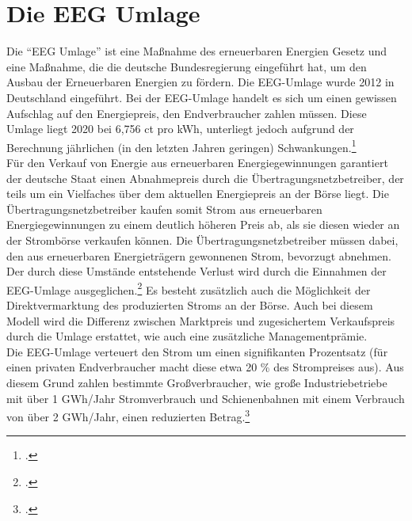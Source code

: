 \section{Die EEG Umlage}
Die \enquote{EEG Umlage} ist eine Maßnahme des erneuerbaren Energien Gesetz und eine Maßnahme, die die deutsche Bundesregierung eingeführt hat, um den Ausbau der Erneuerbaren Energien zu fördern.
Die EEG-Umlage wurde 2012 in Deutschland eingeführt. 
Bei der EEG-Umlage handelt es sich um einen gewissen Aufschlag auf den Energiepreis, den Endverbraucher zahlen müssen.
Diese Umlage liegt 2020 bei 6,756 ct pro kWh, unterliegt jedoch aufgrund der Berechnung jährlichen (in den letzten Jahren geringen) Schwankungen.\footcite[Vgl.][]{Netztransparenz2020}\\
Für den Verkauf von Energie aus erneuerbaren Energiegewinnungen garantiert der deutsche Staat einen Abnahmepreis durch die Übertragungsnetzbetreiber, der teils um ein Vielfaches über dem aktuellen Energiepreis an der Börse liegt.
Die Übertragungsnetzbetreiber kaufen somit Strom aus erneuerbaren Energiegewinnungen zu einem deutlich höheren Preis ab, als sie diesen wieder an der Strombörse verkaufen können. 
Die Übertragungsnetzbetreiber müssen dabei, den aus erneuerbaren Energieträgern gewonnenen Strom, bevorzugt abnehmen.
Der durch diese Umstände entstehende Verlust wird durch die Einnahmen der EEG-Umlage ausgeglichen.\footcite[Vgl. auch im Folgenden][]{Bundesnetzagentur2020}
Es besteht zusätzlich auch die Möglichkeit der Direktvermarktung des produzierten Stroms an der Börse. Auch bei diesem Modell wird die Differenz zwischen Marktpreis und zugesichertem Verkaufspreis durch die Umlage erstattet, wie auch eine zusätzliche Managementprämie.
\\
Die EEG-Umlage verteuert den Strom um einen signifikanten Prozentsatz (für einen privaten Endverbraucher macht diese etwa 20 \% des Strompreises aus). 
Aus diesem Grund zahlen bestimmte Großverbraucher, wie große Industriebetriebe mit über 1 GWh/Jahr Stromverbrauch und Schienenbahnen mit einem Verbrauch von über 2 GWh/Jahr, einen reduzierten Betrag.\footcite[Vgl.][]{Bundesnetzagentur2020}